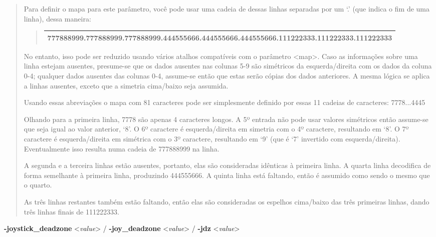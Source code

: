 \documentclass[letterpaper,10pt,brazil]{sphinxmanual}
\begin{document}
\begin{quote}
\begin{quote}
\end{quote}

Para definir o mapa para este parâmetro, você pode usar uma cadeia
de dessas linhas separadas por um `.' (que indica o fim de uma
linha), dessa maneira:
\begin{quote}

\noindent\begin{tabulary}{\linewidth}{|L|}
\hline

777888999.777888999.777888999.444555666.444555666.444555666.111222333.111222333.111222333
\\
\hline\end{tabulary}

\end{quote}

No entanto, isso pode ser reduzido usando vários atalhos compatíveis
com o parâmetro \textless{}map\textgreater{}. Caso as informações sobre uma linha estejam
ausentes, presume-se que os dados ausentes nas colunas 5-9 são
simétricos da esquerda/direita com os dados da coluna 0-4; qualquer
dados ausentes das colunas 0-4, assume-se então que estas serão
cópias dos dados anteriores. A mesma lógica se aplica a linhas
ausentes, exceto que a simetria cima/baixo seja assumida.

Usando essas abreviações o mapa com 81 caracteres pode ser
simplesmente definido por essas 11 cadeias de caracteres:
7778...4445

Olhando para a primeira linha, 7778 são apenas 4 caracteres longos.
A 5º entrada não pode usar valores simétricos então assume-se que
seja igual ao valor anterior, `8'. O 6º caractere é esquerda/direita
em simetria com o 4º caractere, resultando em `8'. O 7º caractere é
esquerda/direita em simétrica com o 3º caractere, resultando em `9'
(que é `7' invertido com esquerda/direita). Eventualmente isso
resulta numa cadeia de 777888999 na linha.

A segunda e a terceira linhas estão ausentes, portanto, elas são
consideradas idênticas à primeira linha. A quarta linha decodifica
de forma semelhante à primeira linha, produzindo 444555666.
A quinta linha está faltando, então é assumido como sendo o mesmo
que o quarto.

As três linhas restantes também estão faltando, então elas são
consideradas os espelhos cima/baixo das três primeiras linhas, dando
três linhas finais de 111222333.
\end{quote}
\label{commandline/commandline-all:mame-commandline-joystickdeadzone}
\textbf{-joystick\_deadzone} \textless{}\emph{value}\textgreater{} / \textbf{-joy\_deadzone} \textless{}\emph{value}\textgreater{} / \textbf{-jdz} \textless{}\emph{value}\textgreater{}
\end{document}
